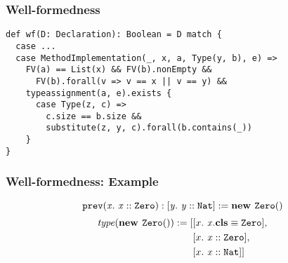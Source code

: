 \begin{frame}[fragile]
\frametitle{Well-formedness}
\begin{prooftree}
\end{prooftree}
\pause
\onslide<+->
\vfill
\begin{lstlisting}[basicstyle=\footnotesize]
def wf(D: Declaration): Boolean = D match {
  case ...
  case MethodImplementation(_, x, a, Type(y, b), e) =>
    FV(a) == List(x) && FV(b).nonEmpty &&
      FV(b).forall(v => v == x || v == y) &&
    typeassignment(a, e).exists {
      case Type(z, c) =>
        c.size == b.size &&
        substitute(z, y, c).forall(b.contains(_))
    }
}
\end{lstlisting}
\end{frame}

\begin{frame}
\frametitle{Well-formedness: Example}
\begin{prooftree}
\end{prooftree}
\[
\mImpl{\texttt{prev}}{x}{\instOf{x}{\texttt{Zero}}}{\type{y}{\instOf{y}{\texttt{Nat}}}}{\newInstNoArgs{\texttt{Zero}}}
\]
\vfill
\begin{align*}
\mIt{type}(\newInstNoArgs{\texttt{Zero}}) := [&\type{x}{\instBy{x}{\texttt{Zero}}},\\
&\type{x}{\instOf{x}{\texttt{Zero}}},\\
&\type{x}{\instOf{x}{\texttt{Nat}}}]
\end{align*}
\end{frame}
